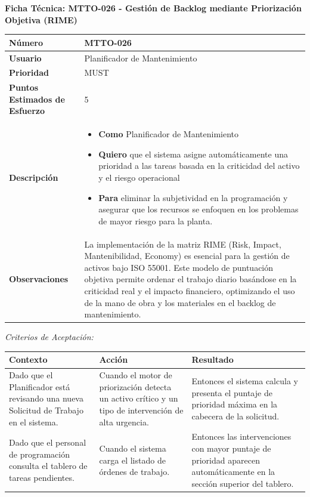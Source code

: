 \vspace{1em}
\noindent\textbf{Ficha Técnica: MTTO-026 - Gestión de Backlog mediante Priorización Objetiva (RIME)}
\footnotesize\setlength{\tabcolsep}{4pt}\renewcommand{\arraystretch}{1.2}
\begin{longtable}{|p{0.21\textwidth}|p{0.74\textwidth}|}\hline
\textbf{Número} & MTTO-026 \\ \hline
\textbf{Usuario} & Planificador de Mantenimiento \\ \hline
\textbf{Prioridad} & MUST \\ \hline
\textbf{Puntos Estimados de Esfuerzo} & 5 \\ \hline
\textbf{Descripción} & \parbox[t]{\linewidth}{\vspace{2pt}\begin{itemize}[leftmargin=1.5em, nosep, topsep=0pt]
\item \textbf{Como} Planificador de Mantenimiento
\item \textbf{Quiero} que el sistema asigne automáticamente una prioridad a las tareas basada en la criticidad del activo y el riesgo operacional
\item \textbf{Para} eliminar la subjetividad en la programación y asegurar que los recursos se enfoquen en los problemas de mayor riesgo para la planta.
\end{itemize}\vspace{2pt}} \\ \hline
\textbf{Observaciones} & La implementación de la matriz RIME (Risk, Impact, Mantenibilidad, Economy) es esencial para la gestión de activos bajo ISO 55001. Este modelo de puntuación objetiva permite ordenar el trabajo diario basándose en la criticidad real y el impacto financiero, optimizando el uso de la mano de obra y los materiales en el backlog de mantenimiento. \\ \hline
\end{longtable}\normalsize
\noindent\textit{Criterios de Aceptación:}
\footnotesize\begin{longtable}{|p{0.28\textwidth}|p{0.32\textwidth}|p{0.34\textwidth}|}\hline
\textbf{Contexto} & \textbf{Acción} & \textbf{Resultado} \\ \hline
\parbox[t]{\linewidth}{Dado que el Planificador está revisando una nueva Solicitud de Trabajo en el sistema.} & \parbox[t]{\linewidth}{Cuando el motor de priorización detecta un activo crítico y un tipo de intervención de alta urgencia.} & \parbox[t]{\linewidth}{Entonces el sistema calcula y presenta el puntaje de prioridad máxima en la cabecera de la solicitud.} \\ \hline
\parbox[t]{\linewidth}{Dado que el personal de programación consulta el tablero de tareas pendientes.} & \parbox[t]{\linewidth}{Cuando el sistema carga el listado de órdenes de trabajo.} & \parbox[t]{\linewidth}{Entonces las intervenciones con mayor puntaje de prioridad aparecen automáticamente en la sección superior del tablero.} \\ \hline
\end{longtable}\normalsize
